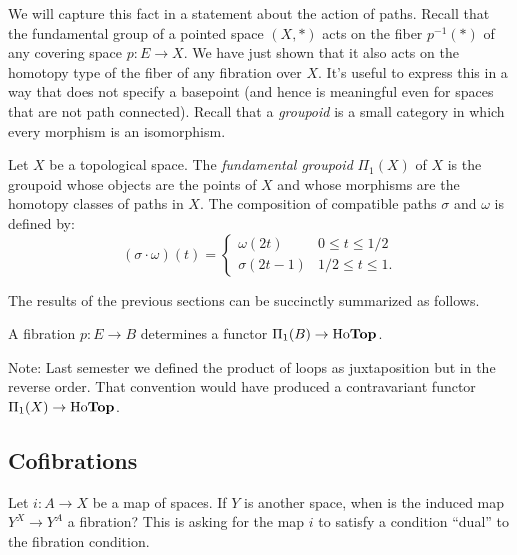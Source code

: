 We will capture this fact in a statement about the action of paths. Recall that
the fundamental group of a pointed space $(X,*)$ acts on the fiber $p^{-1}(*)$
of any covering space $p:E\to X$. We have just shown that it also acts on the
homotopy type of the fiber of any fibration over $X$. It's useful to express
this in a way that does not specify a basepoint (and hence is meaningful
even for spaces that are not path connected). 
Recall that a {\em groupoid} is a small category in which every morphism
is an isomorphism.
\begin{definition}
    Let $X$ be a topological space.
    The \emph{fundamental groupoid} $\Pi_1(X)$ of $X$ is the groupoid
    whose objects are the points of $X$ and whose morphisms are the 
homotopy classes of paths in $X$.
    The composition of compatible paths $\sigma$ and $\omega$ is defined by:
    \begin{equation*}
	(\sigma\cdot\omega)(t) = \begin{cases}
	    \omega(2t) & 0\leq t\leq 1/2\\
	    \sigma(2t - 1) & 1/2\leq t\leq 1.
	\end{cases}
    \end{equation*}
\end{definition}
The results of the previous sections can be succinctly summarized as follows.
\begin{prop}
    A fibration $p:E\to B$ determines a functor $\Pi_1(B)\to\mathrm{Ho}\mathbf{Top}$.
\end{prop}
Note: Last semester we defined the product of loops as juxtaposition but in
the reverse order. That convention would have produced a contravariant functor
$\Pi_1(X)\to\mathrm{Ho}\mathbf{Top}$.

\subsection{Cofibrations}
Let $i:A\to X$ be a map of spaces.
If $Y$ is another space, when is the induced map $Y^X\to Y^A$ a fibration?
This is asking for the map $i$ to satisfy a condition ``dual'' to the 
fibration condition.

